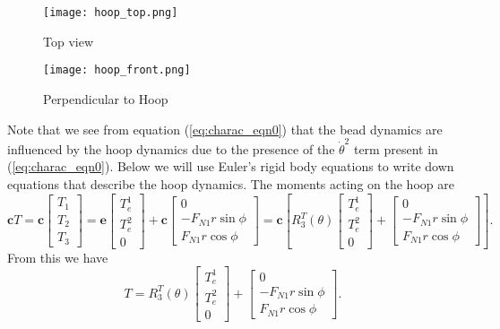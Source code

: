 \documentclass[graybox,envcountchap,sectrefs]{svmonoMuga}
\begin{document}
\begin{figure}[hbtp]
  \begin{center}
  \texttt{[image: hoop\_top.png]}
  \caption{Top view}
  \label{fig:hoop_top}
  \end{center}
\endminipage\hfill
{}
  \begin{center}
  \texttt{[image: hoop\_front.png]}
  \caption{Perpendicular to Hoop}
  \label{fig:hoop_front}
  \end{center}
\endminipage\hfill
\end{figure}
Note that we see from equation (\ref{eq:charac_eqn0}) that the bead dynamics are influenced by the hoop dynamics due to the presence of the $\dot{\theta}^2$ term present in (\ref{eq:charac_eqn0}). 
Below we will use Euler's rigid body equations to write down equations that describe the hoop dynamics.
The moments acting on the hoop are
\[\mathbf{c}T=\mathbf{c}
\begin{bmatrix}
T_1\\T_2\\T_3
\end{bmatrix}
=\mathbf{e}
\begin{bmatrix}
T_e^1\\T_e^2\\0
\end{bmatrix}
+\mathbf{c}
\begin{bmatrix}
0\\-F_{N1}r\sin{\phi}\\F_{N1}r\cos{\phi}
\end{bmatrix}
=\mathbf{c}\left[
R_3^T(\theta)\begin{bmatrix}
T_e^1\\T_e^2\\0
\end{bmatrix}
+\begin{bmatrix}
0\\-F_{N1}r\sin{\phi}\\F_{N1}r\cos{\phi}
\end{bmatrix}\right].
\]
From this we have
\[
T=
R_3^T(\theta)\begin{bmatrix}
T_e^1\\T_e^2\\0
\end{bmatrix}
+\begin{bmatrix}
0\\-F_{N1}r\sin{\phi}\\F_{N1}r\cos{\phi}
\end{bmatrix}.
\]
\end{document}
